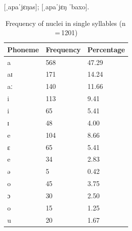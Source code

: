 \pex
	\a {} [ˌapaˈjɛŋas];
	\a {} [ˌapaˈjɛŋ ˈbaxo].
\xe

\begin{table}[pt]\centering
\caption[Frequency of nuclei in single syllables]{Frequency of nuclei in single 
syllables (n\,=\,1201)}
\begin{tabu} to 0.67\linewidth{X X[c] X[c]}
\tableheaderfont\toprule
Phoneme
	& Frequency
	& Percentage
	\\
	
\toprule

a
	& 568
	& 47.29\pct
	\\

aɪ
	& 171
	& 14.24\pct
	\\

aː
	& 140
	& 11.66\pct
	\\

\midrule

i
	& 113
	& 9.41\pct
	\\

\rowfont{\scriptsize\itshape}
\raggedleft
i
	& 65
	& 5.41\pct
	\\

\rowfont{\scriptsize\itshape}
\raggedleft
ɪ
	& 48
	& 4.00\pct
	\\

\midrule

e
	& 104
	& 8.66\pct
	\\

\rowfont{\scriptsize\itshape}
\raggedleft
ɛ
	& 65
	& 5.41\pct
	\\

\rowfont{\scriptsize\itshape}
\raggedleft
e
	& 34
	& 2.83\pct
	\\

\rowfont{\scriptsize\itshape}
\raggedleft
ə
	& 5
	& 0.42\pct
	\\

\midrule

o
	& 45
	& 3.75\pct
	\\

\rowfont{\scriptsize\itshape}
\raggedleft
ɔ
	& 30
	& 2.50\pct
	\\

\rowfont{\scriptsize\itshape}
\raggedleft
o
	& 15
	& 1.25\pct
	\\

\midrule

u
	& 20
	& 1.67\pct
	\\


\end{tabu}
\end{table}
